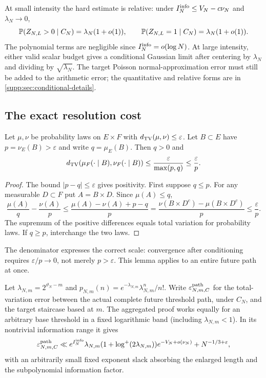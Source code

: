 At small intensity the hard estimate is relative: under
$I_N^{\rm info}\le V_N-c\nu_N$ and $\lambda_N\to0$,
\begin{equation}\label{eq:conditional-one-hit}
 \mathbb P(Z_{N,L}>0\mid C_N)=\lambda_N(1+o(1)),\qquad
 \mathbb P(Z_{N,L}=1\mid C_N)=\lambda_N(1+o(1)).
\end{equation}
The polynomial terms are negligible since $I_N^{\rm info}=o(\log N)$.
At large intensity, either valid scalar budget gives a conditional Gaussian
limit after centering by $\lambda_N$ and dividing by $\sqrt{\lambda_N}$.
The target Poisson normal-approximation error must still be added to the
arithmetic error; the quantitative and relative forms are in
\cref{supp:sec:conditional-details}.

\subsection{The exact resolution cost}
\begin{lemma}\label{lem:conditioning-floor}
Let $\mu,\nu$ be probability laws on $E\times F$ with
$d_{\mathrm{TV}}(\mu,\nu)\le\varepsilon$. Let $B\subset E$ have
$p=\nu_E(B)>\varepsilon$ and write $q=\mu_E(B)$. Then $q>0$ and
\begin{equation}\label{eq:sharp-conditioning}
 d_{\mathrm{TV}}(\mu_F(\cdot\mid B),\nu_F(\cdot\mid B))
 \le\frac{\varepsilon}{\max(p,q)}\le\frac{\varepsilon}{p}.
\end{equation}
\end{lemma}
\begin{proof}
The bound $|p-q|\le\varepsilon$ gives positivity. First suppose $q\le p$.
For any measurable $D\subset F$ put $A=B\times D$. Since $\mu(A)\le q$,
\[
 \frac{\mu(A)}q-\frac{\nu(A)}p
 \le\frac{\mu(A)-\nu(A)+p-q}{p}
 =\frac{\nu(B\times D^c)-\mu(B\times D^c)}p
 \le\frac\varepsilon p.
\]
The supremum of the positive differences equals total variation for
probability laws. If $q\ge p$, interchange the two laws.
\end{proof}
The denominator expresses the correct scale: convergence after conditioning
requires $\varepsilon/p\to0$, not merely $p>\varepsilon$.
This lemma applies to an entire future path at once.

Let $\lambda_{N,m}=2^{\vartheta_N-m}$ and
$p_{N,m}(n)=e^{-\lambda_{N,m}}\lambda_{N,m}^n/n!$.
Write $\varepsilon_{N,m,C}^{\rm path}$ for the total-variation error between
the actual complete future threshold path, under $C_N$, and the target
staircase based at $m$. The aggregated proof works equally for an arbitrary
base threshold in a fixed logarithmic band (including $\lambda_{N,m}<1$).
In its nontrivial information range it gives
\begin{equation}\label{eq:path-error}
 \varepsilon_{N,m,C}^{\rm path}
 \ll e^{I_N^{\rm info}}\lambda_{N,m}
       (1+\log^+(2\lambda_{N,m}))e^{-V_N+o(\nu_N)}
       +N^{-1/3+\varepsilon},
\end{equation}
with an arbitrarily small fixed exponent slack absorbing the enlarged
length and the subpolynomial information factor.

